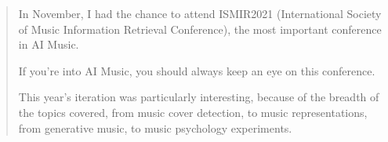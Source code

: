 \documentclass[%
10pt,								%
]
{scrartcl}
\begin{document}
\begin{itemize}
                    \begin{quote}
                        In November, I had the chance to attend ISMIR2021 (International Society of Music Information Retrieval Conference), the most important conference in AI Music.

                        If you’re into AI Music, you should always keep an eye on this conference. 

                        This year’s iteration was particularly interesting, because of the breadth of the topics covered, from music cover detection, to music representations, from generative music, to music psychology experiments. 

                    \end{quote}
            \end{itemize}
   
        
\end{document}
